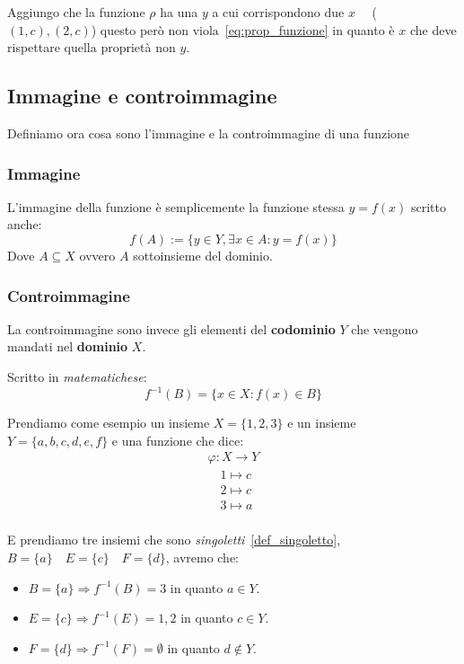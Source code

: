 \documentclass{article}
\theoremstyle{definition}
\begin{document}
Aggiungo che la funzione $ \rho $ ha una $ y $ a cui corrispondono due $ x \quad $ ($ (1,c), (2,c) $) questo però non viola~\ref{eq:prop_funzione} in quanto è $ x $ che deve rispettare quella proprietà non $ y $.  



\subsection{Immagine e controimmagine}
Definiamo ora cosa sono l'immagine e la controimmagine di una funzione

\subsubsection{Immagine}
L'immagine della funzione è semplicemente la funzione stessa $ y = f(x) $ scritto anche:
\begin{equation*}
        f(A) := \{y \in Y, \exists x \in A : y = f(x) \}
\end{equation*}
Dove $ A \subseteq X $ ovvero $ A $ sottoinsieme del dominio. \newline  

\subsubsection{Controimmagine}
La controimmagine sono invece gli elementi del \textbf{codominio} $ Y $ che vengono mandati nel \textbf{dominio} $ X $. \par 
Scritto in \textit{matematichese}:
\begin{equation*}
        {f}^{-1}(B) = \{ x \in X : f(x) \in B  \}
\end{equation*}
 
Prendiamo come esempio un insieme $ X = \{1,2,3\}$ e un insieme $ Y = \{a,b,c,d,e,f\} $  e una funzione che dice:
\begin{align*}
        \varphi : X \to Y \\
        \quad 1 \mapsto c \\
        \quad 2 \mapsto c \\
        \quad 3 \mapsto a \\
\end{align*}

E prendiamo tre insiemi che sono \textit{singoletti}~\ref{def_singoletto}, $ B = \{a\} \quad E = \{c\} \quad F = \{d\}$, avremo che:
\begin{itemize}
        \item $ B = \{a\} \Rightarrow {f}^{-1}(B) = {3} $ in quanto $ a \in Y $. 
        \item $ E = \{c\} \Rightarrow {f}^{-1}(E) = {1,2}$ in quanto $ c \in Y $.  
        \item $ F = \{d\} \Rightarrow {f}^{-1}(F) = {\emptyset} $ in quanto $ d \not \in Y $.
\end{itemize}
\end{document}
